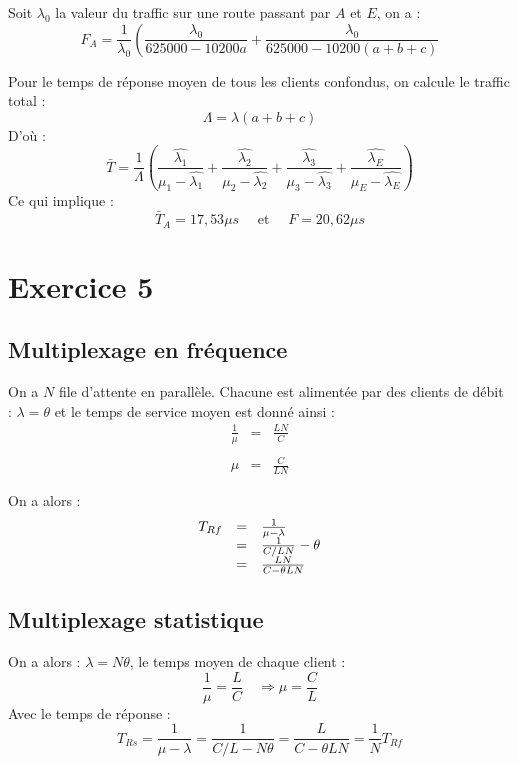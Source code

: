 \documentclass[a4paper, 11pt, fleqn]{article}
\newcommand{\inve}[1]{\frac{1}{#1}}
\begin{document}
Soit $\lambda_0$ la valeur du traffic sur une route passant par $A$ et $E$, on a : $$
F_A = \inve{\lambda_0} \left ( \frac{\lambda_0}{625000 - 10200 a} + \frac{\lambda_0}{625000 -
10200(a+b+c)} \right . $$

Pour le temps de réponse moyen de tous les clients confondus, on calcule le traffic total : $$
\Lambda = \lambda (a+b+c) $$
D'où :$$
\bar T = \inve{\Lambda}\left ( \frac{\hat{\lambda_1}}{\mu_1 - \hat{\lambda_1}} +
\frac{\hat{\lambda_2}}{\mu_2 - \hat{\lambda_2}} + \frac{\hat{\lambda_3}}{\mu_3 - \hat{\lambda_3}} +
\frac{\hat{\lambda_E}}{\mu_E - \hat{\lambda_E}} \right ) $$
Ce qui implique : $$
\bar T_A = 17,53 \mu s \quad \mbox{ et } \quad F = 20,62 \mu s $$

\section{Exercice 5}

\subsection*{Multiplexage en fréquence}

On a $N$ file d'attente en parallèle. Chacune est alimentée par des clients de débit : $\lambda =
\theta $ et le temps de service moyen est donné ainsi : $$
\begin{array}{rcl}
	\displaystyle \inve{\mu} & = & \frac{L N}{C} \\~\\
	\mu & = & \displaystyle \frac{C}{LN}
\end{array} $$

On a alors : $$
\begin{array}{rcl}
	\displaystyle T_{Rf} & = & \inve{\mu - \lambda} \\
				 \displaystyle & = & \inve{C/LN} - \theta \\
				 \displaystyle & = & \frac{LN}{C - \theta LN} \\
\end{array}$$

\subsection*{Multiplexage statistique}

On a alors : $\lambda = N \theta$, le temps moyen de chaque client : $$
	\inve{\mu} = \frac{L}{C} \quad \Longrightarrow \mu = \frac{C}{L} $$
Avec le temps de réponse : $$
T_{Rs} = \inve{\mu - \lambda} = \inve{C/L - N\theta} = \frac{L}{C- \theta L N} = \inve{N} T_{Rf} $$
\end{document}
